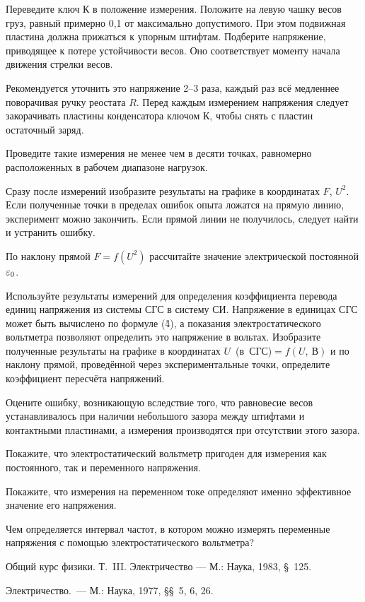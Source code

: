 Переведите ключ К в положение измерения. Положите на левую чашку весов груз, равный примерно 0,1 от максимально
допустимого. При этом подвижная пластина должна прижаться к упорным штифтам. Подберите напряжение, приводящее к потере
устойчивости весов. Оно соответствует моменту начала движения стрелки весов.

Рекомендуется уточнить это напряжение 2--3 раза, каждый раз всё медленнее поворачивая ручку реостата $R$. Перед каждым
измерением напряжения следует закорачивать пластины конденсатора ключом К, чтобы снять с пластин остаточный заряд.

Проведите такие измерения не менее чем в десяти точках, равномерно расположенных в рабочем диапазоне нагрузок.

\n Сразу после измерений изобразите результаты на графике в координатах $F$, $U^2$. Если полученные точки в пределах
ошибок опыта ложатся на прямую линию, эксперимент можно закончить. Если прямой линии не получилось, следует найти и
устранить ошибку.

\n По наклону прямой $F=f(U^2)$  рассчитайте значение электрической постоянной $\varepsilon_0$.

\n Используйте результаты измерений для определения коэффициента перевода единиц напряжения из системы СГС в систему СИ.
Напряжение в единицах СГС может быть вычислено по формуле (\r{4}), а показания электростатического вольтметра позволяют
определить это напряжение в вольтах. Изобразите полученные результаты на графике в координатах $U$~(в~СГС)$=f(U,~В)$ и по
наклону прямой, проведённой через экспериментальные точки, определите коэффициент пересчёта напряжений.

{\small

\kv

\n Оцените ошибку, возникающую вследствие того, что равновесие весов устанавливалось при наличии небольшого зазора между
штифтами и контактными пластинами, а измерения производятся при отсутствии этого зазора.

\n Покажите, что электростатический вольтметр пригоден для измерения как постоянного, так и переменного напряжения.

\n Покажите, что измерения на переменном токе определяют именно эффективное значение его напряжения.

\n Чем определяется интервал частот, в котором можно измерять переменные напряжения с помощью электростатического
вольтметра?


\lit

 Общий курс физики. Т.~III. Электричество --- М.: Наука, 1983, \S~125.

 Электричество.~--- М.: Наука, 1977, \S\S~5, 6, 26.


}
